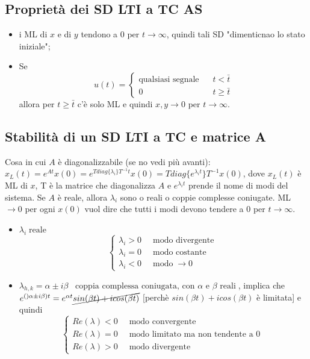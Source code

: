 \subsection{Proprietà dei SD LTI a TC AS}
\begin{itemize}
    \item i ML di $x$ e di $y$ tendono a $0$ per $t \rightarrow  \infty$, quindi tali SD "dimenticnao lo stato iniziale";
    \item Se 
    \[
        u(t) = \begin{cases}
            \text{qualsiasi segnale}\; \;\; & t< \bar{t}\\
            0 & t \geq \bar{t}
        \end{cases}
    \]
    allora per $t \geq \bar{t}$ c'è solo ML e quindi $x,y \rightarrow 0$ per $t \rightarrow \infty$.
\end{itemize}
\subsection{Stabilità di un SD LTI a TC e matrice A}
Cosa in cui $A$ è diagonalizzabile (se no vedi più avanti):
$x_L (t) = e^{At} x(0) = e^{T diag\{\lambda_i\}T^{-1} t}x(0) = T diag\{e^{\lambda_i t}\}T^{-1}x(0)$, dove $x_L(t)$ è ML di $x$, T è la matrice che diagonalizza $A$ e $e^{\lambda_it}$ prende il nome di modi del sistema.\newline
\newline
Se $A$ è reale, allora $\lambda_i$ sono o reali o coppie complesse coniugate.\newline
ML $\rightarrow  0$ per ogni $x(0)$ vuol dire che tutti i modi devono tendere a $0$ per $t \rightarrow \infty$.
\begin{itemize}
    \item $\lambda_i \; \text{reale}$
    \[
        \begin{cases}
            \lambda_i >0 \;\;& \text{modo divergente}\;\\
            \lambda_i =0 \;\;& \text{modo costante}\;\\
            \lambda_i <0 \;\;& \text{modo}\;\rightarrow  0
        \end{cases}
    \]
    \item $\lambda_{h,k} = \alpha \pm i \beta \;\;\;\text{coppia complessa coniugata, con $\alpha$ e $\beta$ reali}\;$, implica che $e^{()\alpha \pm i \beta)t} = e^{\alpha t} \cancel{sin(\beta t) + i cos(\beta t)}$ [perchè $sin(\beta t) + i cos(\beta t)$ è limitata] e quindi
    \[
        \begin{cases}
            Re(\lambda) < 0 \;\; & \text{modo convergente}\;\\
            Re(\lambda) = 0 \;\; & \text{modo limitato ma non tendente a $0$}\;\\
            Re(\lambda) > 0 \;\; & \text{modo divergente}\;
        \end{cases}
    \]
\end{itemize}
